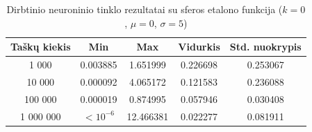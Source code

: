 \begin{table}[H]
    \centering
    \begin{tabular}{|c|c|c|c|c|}
        \hline
        \textbf{Taškų kiekis} & \textbf{Min} & \textbf{Max} & \textbf{Vidurkis} & \textbf{Std. nuokrypis} \\ \hline
        1 000        & 0.003885 & 1.651999 & 0.226698 & 0.253067 \\ \hline
        10 000       & 0.000092 & 4.065172 & 0.121583 & 0.236088 \\ \hline
        100 000      & 0.000019 & 0.874995 & 0.057946 & 0.030408 \\ \hline
        1 000 000    & $<10^{-6}$ & 12.466381 & 0.022277 & 0.081911 \\ \hline
    \end{tabular}
    \caption{Dirbtinio neuroninio tinklo rezultatai su sferos etalono funkcija ($k = 0$, $\mu = 0$, $\sigma = 5$)}
\end{table}